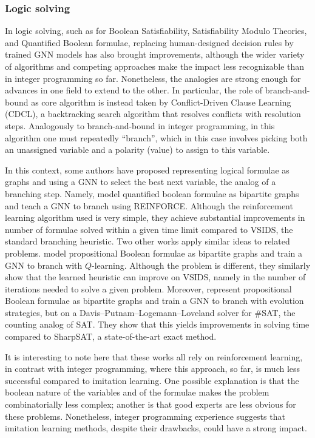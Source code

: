 \documentclass[twoside,11pt]{article}
\begin{document}
\subsubsection{Logic solving}

In logic solving,  such as for Boolean Satisfiability, Satisfiability Modulo Theories, and Quantified Boolean formulae, replacing human-designed decision rules by trained GNN models has also brought improvements, although the wider variety of algorithms and competing approaches make the impact less recognizable than in integer programming so far. Nonetheless, the analogies are strong enough for advances in one field to extend to the other. In particular, the role of branch-and-bound as core algorithm is instead taken by Conflict-Driven Clause Learning (CDCL), a backtracking search algorithm that resolves conflicts with resolution steps. Analogously to branch-and-bound in integer programming, in this algorithm one must repeatedly ``branch'', which in this case involves picking both an unassigned variable and a polarity (value) to assign to this variable. 

In this context, some authors have proposed representing logical formulae as graphs and using a GNN to select the best next variable, the analog of a branching step. Namely, \citet{Lederman2018} model quantified boolean formulae as bipartite graphs and teach a GNN to branch using REINFORCE. Although the reinforcement learning algorithm used is very simple, they achieve substantial improvements in number of formulae solved within a given time limit compared to VSIDS, the standard branching heuristic. Two other works apply similar ideas to related problems. \citet{Kur+2020} model propositional Boolean formulae as bipartite graphs and train a GNN to branch with $Q$-learning. Although the problem is different, they similarly show that the learned heuristic can improve on VSIDS, namely in the number of iterations needed to solve a given problem. Moreover, \citet{Vaezipoor2020} represent propositional Boolean formulae as bipartite graphs and train a GNN to branch with evolution strategies, but on a Davis–Putnam–Logemann–Loveland solver for \#SAT, the counting analog of SAT. They show that this yields improvements in solving time compared to SharpSAT, a state-of-the-art exact method. 

It is interesting to note here that these works all rely on reinforcement learning, in contrast with integer programming, where this approach, so far, is much less successful compared to imitation learning. One possible explanation is that the boolean nature of the variables and of the formulae makes the problem combinatorially less complex; another is that good experts are less obvious for these problems. Nonetheless, integer programming experience suggests that imitation learning methods, despite their drawbacks, could have a strong impact.
\end{document}
